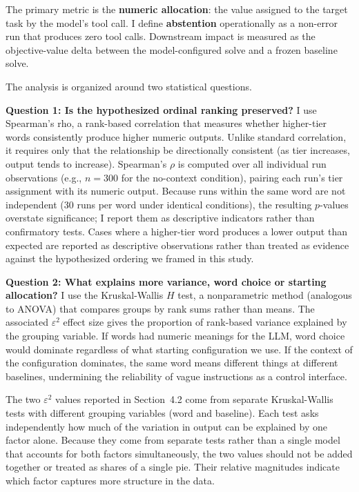 \documentclass[11pt]{article}
\begin{document}
The primary metric is the \textbf{numeric allocation}: the value assigned to the target task by the model's tool call. I define \textbf{abstention} operationally as a non-error run that produces zero tool calls. Downstream impact is measured as the objective-value delta between the model-configured solve and a frozen baseline solve.

The analysis is organized around two statistical questions.

\textbf{Question 1: Is the hypothesized ordinal ranking preserved?} I use Spearman's rho, a rank-based correlation that measures whether higher-tier words
consistently produce higher numeric outputs. Unlike standard correlation, it requires only
that the relationship be directionally consistent (as tier increases, output tends to
increase). Spearman's $\rho$ is computed over all individual run observations (e.g., $n = 300$ for the no-context condition), pairing each run's tier assignment with its numeric output. Because runs within the same word are not independent (30 runs per word under identical conditions), the resulting $p$-values overstate significance; I report them as descriptive indicators rather than confirmatory tests. Cases where a
higher-tier word produces a lower output than expected are reported as descriptive
observations rather than treated as evidence against the hypothesized ordering we framed in this study.

\textbf{Question 2: What explains more variance, word choice or starting allocation?} I use the Kruskal-Wallis $H$ test, a nonparametric method (analogous to ANOVA) that compares groups by rank sums rather than means. The associated $\varepsilon^2$ effect size gives the proportion of rank-based variance explained by the grouping variable. If words had numeric meanings for the LLM, word choice would dominate regardless of what starting configuration we use. If the context of the configuration dominates, the same word means different things at different baselines, undermining the reliability of vague instructions as a control interface.

The two $\varepsilon^2$ values reported in Section~4.2 come from separate Kruskal-Wallis tests with different grouping variables (word and baseline). Each test asks independently how much of the variation in output can be explained by one factor alone. Because they come from separate tests rather than a single model that accounts for both factors simultaneously, the two values should not be added together or treated as shares of a single pie. Their relative magnitudes indicate which factor captures more structure in the data.
\end{document}
